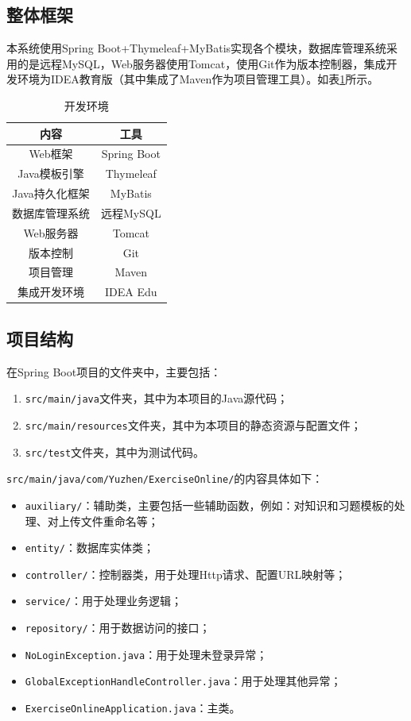 \documentclass{nwafucoursepaper}
\begin{document}
\subsection{整体框架}

本系统使用Spring Boot+Thymeleaf+MyBatis实现各个模块，数据库管理系统采用的是远程MySQL，Web服务器使用Tomcat，使用Git作为版本控制器，集成开发环境为IDEA教育版（其中集成了Maven作为项目管理工具）。如表\ref{environment}所示。

\begin{table}[htp]
  \centering
  \begin{tabular}{|c|c|}
  \hline
  内容        & 工具          \\ \hline
  Web框架     & Spring Boot \\ \hline
  Java模板引擎  & Thymeleaf   \\ \hline
  Java持久化框架 & MyBatis     \\ \hline
  数据库管理系统   & 远程MySQL     \\ \hline
  Web服务器     & Tomcat     \\ \hline
  版本控制      & Git         \\ \hline
  项目管理      & Maven       \\ \hline
  集成开发环境    & IDEA Edu    \\ \hline
  \end{tabular}
  \caption{开发环境}
  \label{environment}
\end{table}

\subsection{项目结构}

在Spring Boot项目的文件夹中，主要包括：
\begin{enumerate}
  \item \verb|src/main/java|文件夹，其中为本项目的Java源代码；
  \item \verb|src/main/resources|文件夹，其中为本项目的静态资源与配置文件；
  \item \verb|src/test|文件夹，其中为测试代码。
\end{enumerate}

\verb|src/main/java/com/Yuzhen/ExerciseOnline/|的内容具体如下：
\begin{itemize}
    \item \verb|auxiliary/|：辅助类，主要包括一些辅助函数，例如：对知识和习题模板的处理、对上传文件重命名等；
    \item \verb|entity/|：数据库实体类；
    \item \verb|controller/|：控制器类，用于处理Http请求、配置URL映射等；
    \item \verb|service/|：用于处理业务逻辑；
    \item \verb|repository/|：用于数据访问的接口；
    \item \verb|NoLoginException.java|：用于处理未登录异常；
    \item \verb|GlobalExceptionHandleController.java|：用于处理其他异常；
    \item \verb|ExerciseOnlineApplication.java|：主类。
\end{itemize}
\end{document}
